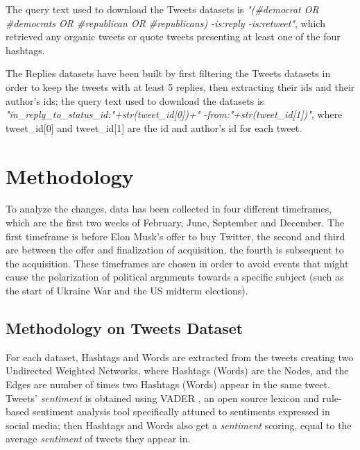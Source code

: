\documentclass[twoside,twocolumn]{article}
\begin{document}
	The query text used to download the Tweets datasets is \textit{"(\#democrat OR \#democrats OR \#republican OR \#republicans) -is:reply -is:retweet"}, which retrieved any organic tweets or quote tweets presenting at least one of the four hashtags.
	
	The Replies datasets have been built by first filtering the Tweets datasets in order to keep the tweets with at least 5 replies, then extracting their ids and their author's ids; the query text used to download the datasets is \textit{"in\_reply\_to\_status\_id:"+str(tweet\_id[0])+" -from:"+str(tweet\_id[1])"}, where tweet\_id[0] and tweet\_id[1] are the id and author's id for each tweet.
	
	
	\section{Methodology}
	To analyze the changes, data has been collected in four different timeframes, which are the first two weeks of February, June, September and December.
	The first timeframe is before Elon Musk's offer to buy Twitter, the second and third are between the offer and finalization of acquisition, the fourth is subsequent to the acquisition.
	These timeframes are chosen in order to avoid events that might cause the polarization of political arguments towards a specific subject (such as the start of Ukraine War and the US midterm elections).
	
	\subsection{Methodology on Tweets Dataset}
	For each dataset, Hashtags and Words are extracted from the tweets creating two Undirected Weighted Networks, where Hashtags (Words) are the Nodes, and the Edges are number of times two Hashtags (Words) appear in the same tweet.\\
	
	Tweets' \textit{sentiment} is obtained using VADER \cite{VADER}, an open source lexicon and rule-based sentiment analysis tool specifically attuned to sentiments expressed in social media; then Hashtags and Words also get a \textit{sentiment} scoring, equal to the average \textit{sentiment} of tweets they appear in.\\
	
\end{document}
